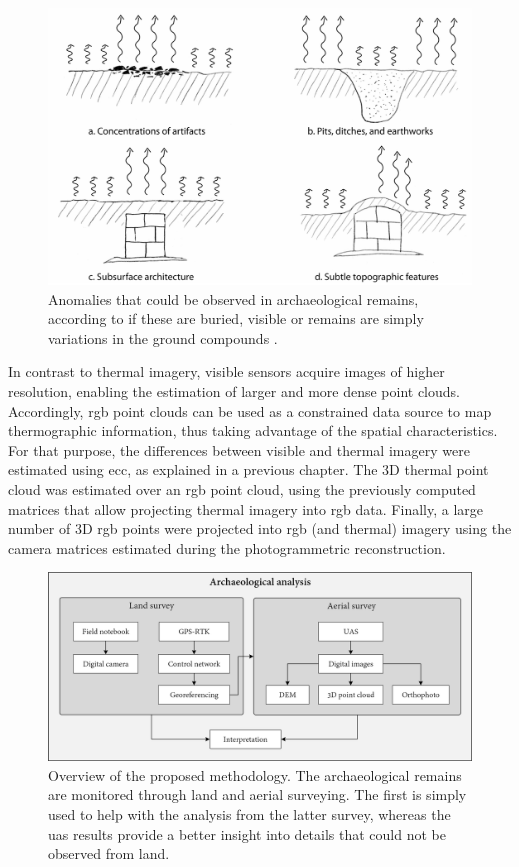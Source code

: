 \begin{figure}[ht]
    \centering
    \includegraphics[width=\linewidth]{figs/castle_puerta_arenas/thermal_exchanging.png}
	\caption{Anomalies that could be observed in archaeological remains, according to if these are buried, visible or remains are simply variations in the ground compounds \cite{casana_archaeological_2017}.}
	\label{fig:thermal_transfer}
\end{figure}

In contrast to thermal imagery, visible sensors acquire images of higher resolution, enabling the estimation of larger and more dense point clouds. Accordingly, \acrshort{rgb} point clouds can be used as a constrained data source to map thermographic information, thus taking advantage of the spatial characteristics. For that purpose, the differences between visible and thermal imagery were estimated using \acrshort{ecc}, as explained in a previous chapter. The 3D thermal point cloud was estimated over an \acrshort{rgb} point cloud, using the previously computed matrices that allow projecting thermal imagery into \acrshort{rgb} data. Finally, a large number of 3D \acrshort{rgb} points were projected into \acrshort{rgb} (and thermal) imagery using the camera matrices estimated during the photogrammetric reconstruction. 

\begin{figure}[htbp]
   \centering
    \includegraphics[width=\linewidth]{figs/castle_puerta_arenas/overview.png}
   \caption{Overview of the proposed methodology. The archaeological remains are monitored through land and aerial surveying. The first is simply used to help with the analysis from the latter survey, whereas the \acrshort{uas} results provide a better insight into details that could not be observed from land.}
   \label{fig:thermal_analysis_overview}
\end{figure}

